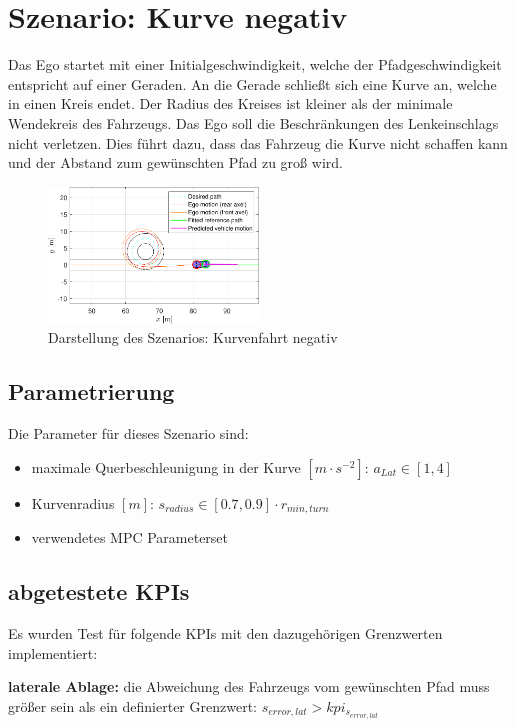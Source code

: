 \section{Szenario: Kurve negativ} \label{sec:kurveNegativ}
Das Ego startet mit einer Initialgeschwindigkeit, welche der Pfadgeschwindigkeit entspricht auf einer Geraden. An die Gerade schließt sich eine Kurve an, welche in einen Kreis endet. Der Radius des Kreises ist kleiner als der minimale Wendekreis des Fahrzeugs. Das Ego soll die Beschränkungen des Lenkeinschlags nicht verletzen. Dies führt dazu, dass das Fahrzeug die Kurve nicht schaffen kann und der Abstand zum gewünschten Pfad zu groß wird.
\begin{figure}[ht]
    \centering
    \includegraphics[width=0.5\textwidth]{figures/3_Implementierung/Curve_negative/test_curve_negative_depiction.pdf}
    \caption{Darstellung des Szenarios: Kurvenfahrt negativ}
    \label{fig:test_curve_negative_depiction}
\end{figure}

\subsection{Parametrierung}
Die Parameter für dieses Szenario sind:
\begin{itemize}
    \item maximale Querbeschleunigung in der Kurve $[m\cdot s^{-2}]$: $a_{Lat} \in [1,4]$
    \item Kurvenradius $[m]$: $s_{radius} \in [0.7,0.9]\cdot r_{min,turn}$
    \item verwendetes MPC Parameterset
\end{itemize}

\subsection{abgetestete KPIs}
Es wurden Test für folgende KPIs mit den dazugehörigen Grenzwerten implementiert:

\medskip\noindent\textbf{laterale Ablage:} die Abweichung des Fahrzeugs vom gewünschten Pfad muss größer sein als ein definierter Grenzwert: $s_{error,lat} > kpi_{s_{error,lat}}$

